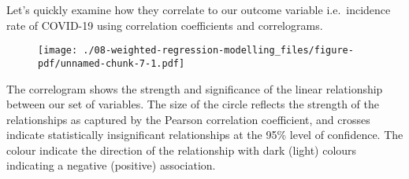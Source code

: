 \documentclass[
  letterpaper,
  krantz2]{style/krantz}
\newenvironment{Shaded}{\begin{snugshade}}{\end{snugshade}}
\newcommand{\AttributeTok}[1]{\textcolor[rgb]{0.40,0.45,0.13}{#1}}
\newcommand{\CommentTok}[1]{\textcolor[rgb]{0.37,0.37,0.37}{#1}}
\newcommand{\ConstantTok}[1]{\textcolor[rgb]{0.56,0.35,0.01}{#1}}
\newcommand{\DecValTok}[1]{\textcolor[rgb]{0.68,0.00,0.00}{#1}}
\newcommand{\FloatTok}[1]{\textcolor[rgb]{0.68,0.00,0.00}{#1}}
\newcommand{\FunctionTok}[1]{\textcolor[rgb]{0.28,0.35,0.67}{#1}}
\newcommand{\NormalTok}[1]{\textcolor[rgb]{0.00,0.23,0.31}{#1}}
\newcommand{\OtherTok}[1]{\textcolor[rgb]{0.00,0.23,0.31}{#1}}
\newcommand{\SpecialCharTok}[1]{\textcolor[rgb]{0.37,0.37,0.37}{#1}}
\newcommand{\StringTok}[1]{\textcolor[rgb]{0.13,0.47,0.30}{#1}}
\begin{document}
Let's quickly examine how they correlate to our outcome variable
i.e.~incidence rate of COVID-19 using correlation coefficients and
correlograms.

\begin{Shaded}
\end{Shaded}

\begin{figure}[H]

{\centering \texttt{[image: ./08-weighted-regression-modelling\_files/figure-pdf/unnamed-chunk-7-1.pdf]}

}

\end{figure}

The correlogram shows the strength and significance of the linear
relationship between our set of variables. The size of the circle
reflects the strength of the relationships as captured by the Pearson
correlation coefficient, and crosses indicate statistically
insignificant relationships at the 95\% level of confidence. The colour
indicate the direction of the relationship with dark (light) colours
indicating a negative (positive) association.
\end{document}
